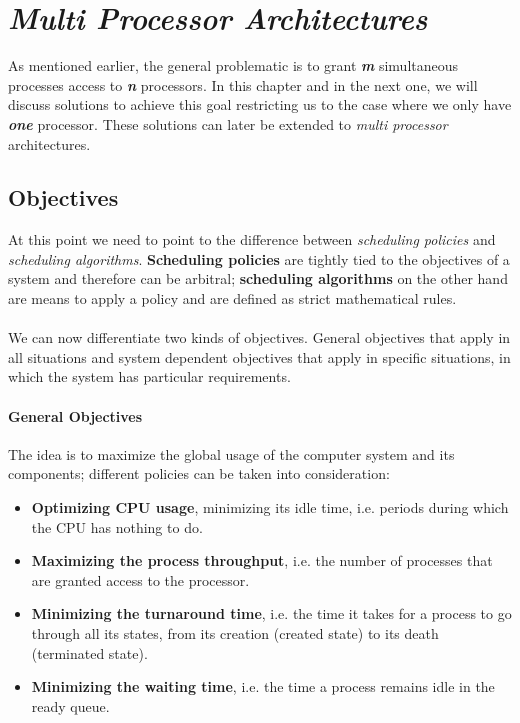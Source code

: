 \documentclass[11pt,a4paper]{scrreprt}
\begin{document}
\section{\textit{Multi Processor Architectures}}
As mentioned earlier, the general problematic is to grant \textbf{\textit{m}} simultaneous processes access to \textbf{\textit{n}} processors. In this chapter and in the next one, we will discuss solutions to achieve this goal restricting us to the case where we only have \textbf{\textit{one}} processor. These solutions can later be extended to \textit{multi processor} architectures.

\subsection{Objectives}
At this point we need to point to the difference between \textit{scheduling policies} and \textit{scheduling algorithms}. \textbf{Scheduling policies} are tightly tied to the objectives of a system and therefore can be arbitral; \textbf{scheduling algorithms} on the other hand are means to apply a policy and are defined as strict mathematical rules. \\\\
We can now differentiate two kinds of objectives. General objectives that apply in all situations and system dependent objectives that apply in specific situations, in which the system has particular requirements.
\paragraph{General Objectives} 
The idea is to maximize the global usage of the computer system and its components; different policies can be taken into consideration:
\begin{itemize}
\item \textbf{Optimizing CPU usage}, minimizing its idle time, i.e. periods during which the CPU has nothing to do.
\item \textbf{Maximizing the process throughput}, i.e. the number of processes that are granted access to the processor.
\item \textbf{Minimizing the turnaround time}, i.e. the time it takes for a process to go through all its states, from its creation (created state) to its death (terminated state).
\item \textbf{Minimizing the waiting time}, i.e. the time a process remains idle in the ready queue.
\end{itemize}
\end{document}
